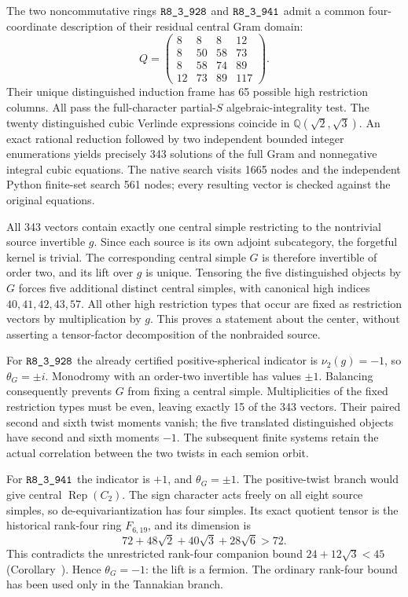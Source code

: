 The two noncommutative rings $\sha{R8_3_928}$ and $\sha{R8_3_941}$ admit a common
four-coordinate description of their residual central Gram domain:
\[
 Q=\begin{pmatrix}8&8&8&12\\8&50&58&73\\8&58&74&89\\12&73&89&117\end{pmatrix}.
\]
Their unique distinguished induction frame has 65 possible high restriction
columns.  All pass the full-character partial-$S$ algebraic-integrality test.
The twenty distinguished cubic Verlinde expressions coincide in
$\mathbb Q(\sqrt2,\sqrt3)$.  An exact rational reduction followed by two
independent bounded integer enumerations yields precisely 343 solutions of
the full Gram and nonnegative integral cubic equations.  The native search
visits 1665 nodes and the independent Python finite-set search 561 nodes;
every resulting vector is checked against the original equations.

All 343 vectors contain exactly one central simple restricting to the
nontrivial source invertible $g$.  Since each source is its own adjoint
subcategory, the forgetful kernel is trivial.  The corresponding central
simple $G$ is therefore invertible of order two, and its lift over $g$ is
unique.  Tensoring the five distinguished objects by $G$ forces five
additional distinct central simples, with canonical high indices
$40,41,42,43,57$.  All other high restriction types that occur are fixed
as restriction vectors by multiplication by $g$.  This proves a statement
about the center, without asserting a tensor-factor decomposition of the
nonbraided source.

For $\sha{R8_3_928}$ the already certified positive-spherical indicator is
$\nu_2(g)=-1$, so $\theta_G=\pm i$.  Monodromy with an order-two invertible
has values $\pm1$.  Balancing consequently prevents $G$ from fixing a
central simple.  Multiplicities of the fixed restriction types must be
even, leaving exactly 15 of the 343 vectors.  Their paired second and
sixth twist moments vanish; the five translated distinguished objects
have second and sixth moments $-1$.  The subsequent finite systems retain
the actual correlation between the two twists in each semion orbit.

For $\sha{R8_3_941}$ the indicator is $+1$, and $\theta_G=\pm1$.
The positive-twist branch would give central $\operatorname{Rep}(C_2)$.
The sign character acts freely on all eight source simples, so
de-equivariantization has four simples.  Its exact quotient tensor is
the historical rank-four ring $F_{6,19}$, and its dimension is
\[
 72+48\sqrt2+40\sqrt3+28\sqrt6>72.
\]
This contradicts the unrestricted rank-four companion bound
$24+12\sqrt3<45$ (Corollary~).
Hence $\theta_G=-1$: the lift is a fermion.  The ordinary rank-four bound
has been used only in the Tannakian branch.


